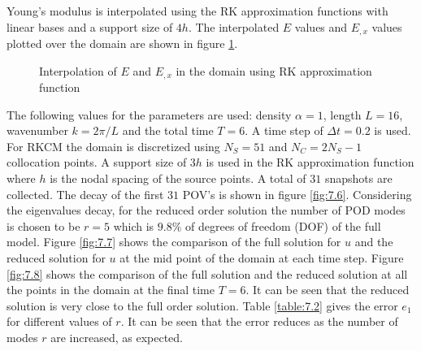 \documentclass[10pt,letterpaper, onecolumn]{article}
\begin{document}
\noindent Young's modulus is interpolated using the RK approximation functions with linear bases and a support size of $4h$. The interpolated $E$ values and $E_{,x}$ values plotted over the domain are shown in figure \ref{fig:7.5}. 
%
%
\begin{figure}[H] %
  \begin{center}
     \hfill %
     \hfill
  \end{center}
  \caption{Interpolation of $E$ and $E_{,x}$ in the domain using RK approximation function}
  \label{fig:7.5}
\end{figure}
%
%
The following values for the parameters are used: density $\alpha = 1$, length $L=16$, wavenumber $k = 2 \pi /L$ and the total time $T = 6$.  A time step of $\Delta t = 0.2$ is used. For RKCM the domain is discretized using $N_S = 51$ and $N_C = 2 N_S-1$ collocation points. A support size of $3h$ is used in the RK approximation function where $h$ is the nodal spacing of the source points. A total of $31$ snapshots are collected. The decay of the first $31$ POV's is shown in figure \ref{fig:7.6}. Considering the eigenvalues decay, for the reduced order solution the number of POD modes is chosen to be $r=5$ which is $9.8\%$ of degrees of freedom (DOF) of the full model. Figure \ref{fig:7.7} shows the comparison of the full solution for $u$ and the reduced solution for $u$ at the mid point of the domain at each time step. Figure \ref{fig:7.8} shows the comparison of the full solution and the reduced solution at all the points in the domain at the final time $T = 6$. It can be seen that the reduced solution is very close to the full order solution. Table \ref{table:7.2} gives the error $e_1$ for different values of $r$. It can be seen that the error reduces as the number of modes $r$ are increased, as expected.
\end{document}
